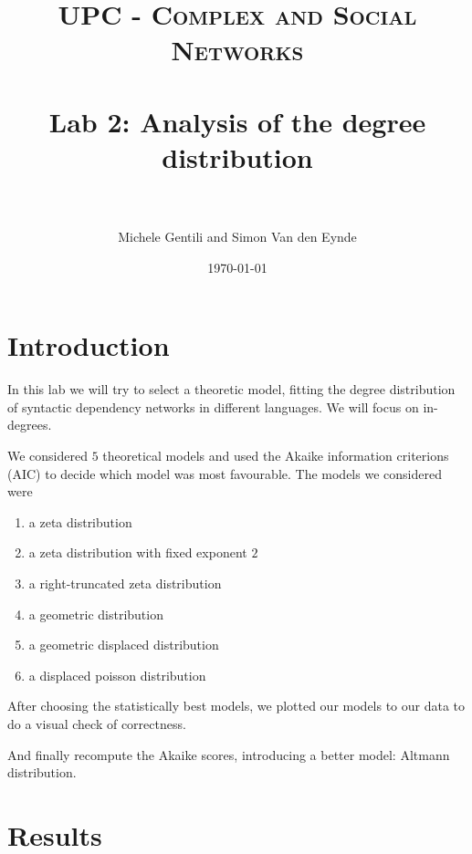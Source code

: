 \documentclass[paper=a4, fontsize=11pt]{scrartcl} %
\title{	
\normalfont \normalsize 
\textsc{UPC - Complex and Social Networks} \\ [25pt] %
\horrule{0.5pt} \\[0.4cm] %
\huge Lab 2: Analysis of the degree distribution\\ %
\horrule{2pt} \\[0.5cm] %
}
\author{Michele Gentili and Simon Van den Eynde} %
\date{\normalsize\today} %
\theoremstyle{plain}
\begin{document}
\maketitle %


\section{Introduction}
In this lab we will try to select a theoretic model, fitting the degree distribution of syntactic dependency networks in different languages. We will focus on in-degrees.

We considered $5$ theoretical models and used the Akaike information criterions (AIC) to decide which model was most favourable. The models we considered were
\begin{enumerate}
\item a zeta distribution
\item a zeta distribution with fixed exponent $2$
\item a right-truncated zeta distribution
\item a geometric distribution 
\item a geometric displaced distribution  
\item a displaced poisson distribution
\end{enumerate}

After choosing the statistically best models, we plotted our models to our data to do a visual check of correctness.

And finally recompute the Akaike scores, introducing a better model: Altmann distribution.

\section{Results}
\end{document}
